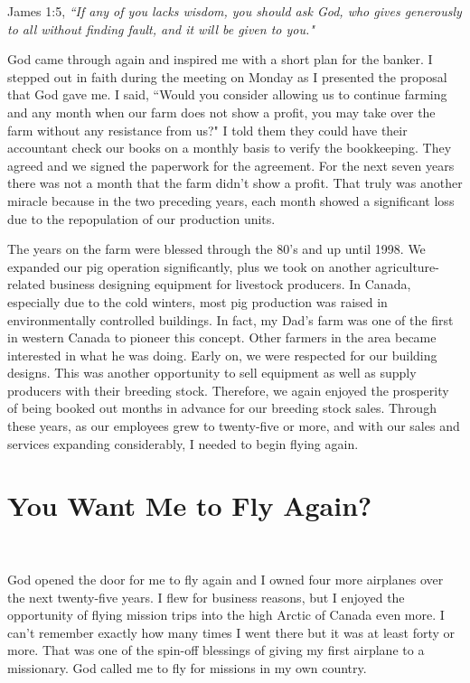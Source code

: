 \documentclass[oneside,12pt]{book}
\begin{document}
James 1:5, \textit{``If any of you lacks wisdom, you should ask God, who gives generously to all without finding fault, and it will be given to you."}

God came through again and inspired me with a short plan for the banker. I stepped out in faith during the meeting on Monday as I presented the proposal that God gave me. I said, ``Would you consider allowing us to continue farming and any month when our farm does not show a profit, you may take over the farm without any resistance from us?" I told them they could have their accountant check our books on a monthly basis to verify the bookkeeping. They agreed and we signed the paperwork for the agreement. For the next seven years there was not a month that the farm didn't show a profit. That truly was another miracle because in the two preceding years, each month showed a significant loss due to the repopulation of our production units.

The years on the farm were blessed through the 80's and up until 1998. We expanded our pig operation significantly, plus we took on another agriculture-related business designing equipment for livestock producers. In Canada, especially due to the cold winters, most pig production was raised in environmentally controlled buildings. In fact, my Dad's farm was one of the first in western Canada to pioneer this concept. Other farmers in the area became interested in what he was doing. Early on, we were respected for our building designs. This was another opportunity to sell equipment as well as supply producers with their breeding stock. Therefore, we again enjoyed the prosperity of being booked out months in advance for our breeding stock sales. Through these years, as our employees grew to twenty-five or more, and with our sales and services expanding considerably, I needed to begin flying again.


\section{You Want Me to Fly Again?}
\

God opened the door for me to fly again and I owned four more airplanes over the next twenty-five years. I flew for business reasons, but I enjoyed the opportunity of flying mission trips into the high Arctic of Canada even more. I can't remember exactly how many times I went there but it was at least forty or more. That was one of the spin-off blessings of giving my first airplane to a missionary. God called me to fly for missions in my own country. 
\end{document}
